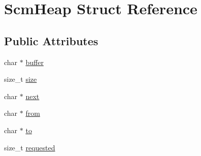 \hypertarget{struct_scm_heap}{\section{Scm\-Heap Struct Reference}
\label{struct_scm_heap}
}
\subsection*{Public Attributes}
\begin{DoxyCompactItemize}
\item 
char $\ast$ \hyperlink{struct_scm_heap_a5ff49e3bcbe9bc4bd659a7d1b3414606}{buffer}
\item 
size\-\_\-t \hyperlink{struct_scm_heap_a4fa4d11ee8b944bbad916007ff2a1f5a}{size}
\item 
char $\ast$ \hyperlink{struct_scm_heap_a71601a799b087f170926858907c84b9a}{next}
\item 
char $\ast$ \hyperlink{struct_scm_heap_abde3e0112b373c0cdf614749603b953d}{from}
\item 
char $\ast$ \hyperlink{struct_scm_heap_a3ca35961c6693ea9b5c19d2c2420caba}{to}
\item 
size\-\_\-t \hyperlink{struct_scm_heap_a7daedc58f94d96335b57d39d604042bf}{requested}
\end{DoxyCompactItemize}


